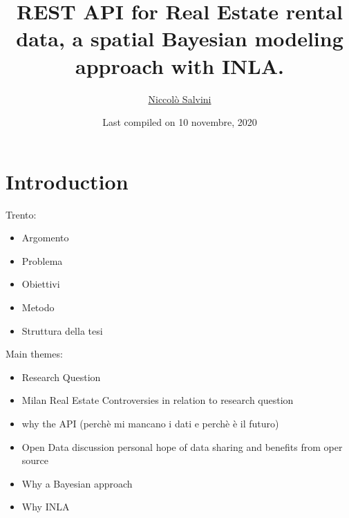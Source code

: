 \documentclass[
  12pt,
  a4paper,
  oneside]{book}
\title{REST API for Real Estate rental data, a spatial Bayesian modeling approach with INLA.}
\author{\href{https://niccolosalvini.netlify.app/}{Niccolò Salvini}}
\date{Last compiled on 10 novembre, 2020}
\providecommand{\tightlist}{%
  \setlength{\itemsep}{0pt}\setlength{\parskip}{0pt}}
\let\oldmaketitle\maketitle
\theoremstyle{definition}
\theoremstyle{definition}
\theoremstyle{definition}
\theoremstyle{remark}
\begin{document}
\maketitle


\newpage

\let\maketitle\oldmaketitle
\maketitle

{
\setcounter{tocdepth}{2}
\tableofcontents
}
\listoftables
\listoffigures
{}
\hypertarget{intro}{%
\chapter{Introduction}\label{intro}}

Trento:

\begin{itemize}
\tightlist
\item
  Argomento
\item
  Problema
\item
  Obiettivi
\item
  Metodo
\item
  Struttura della tesi
\end{itemize}

Main themes:

\begin{itemize}
\tightlist
\item
  Research Question
\item
  Milan Real Estate Controversies in relation to research question
\item
  why the API (perchè mi mancano i dati e perchè è il futuro)
\item
  Open Data discussion personal hope of data sharing and benefits from oper source
\item
  Why a Bayesian approach
\item
  Why INLA
\end{itemize}
\end{document}
